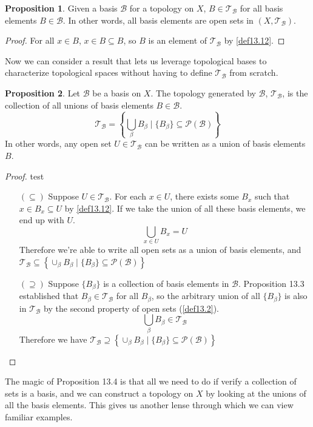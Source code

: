 \documentclass{article}
\newcommand{\T}{\mathcal{T}}
\theoremstyle{definition}
\newtheorem{proposition}{Proposition}[section]
\begin{document}
	\begin{proposition}
		Given a basis $\mathscr B$ for a topology on $X$, $B\in\T_{\mathscr B}$ for all basis elements $B\in\mathscr{B}$. In other words, all basis elements are open sets in $(X,\T_{\mathscr B})$.
	\end{proposition}
	\begin{proof}
		For all $x\in B$, $x\in B\subseteq B$, so $B$ is an element of $\T_{\mathscr B}$ by \cref{def13.12}. 
	\end{proof}

	Now we can consider a result that lets us leverage topological bases to characterize topological spaces without having to define $\T_{\mathscr B}$ from scratch. 
	
	\begin{proposition}
		Let $\mathscr{B}$ be a basis on $X$. The topology generated by $\mathscr{B}$, $\T_{\mathscr B}$, is the collection of all unions of basis elements $B\in\mathscr{B}$. 
		$$ \T_{\mathscr B} = \left\{\bigcup_{\beta}B_\beta \mid \{B_\beta\} \subseteq \mathcal P(\mathscr{B})\right\}$$
		In other words, any open set $U\in \T_{\mathscr B}$ can be written as a union of basis elements $B$.
	\end{proposition}
	\begin{proof}{\color{white}test}
		\begin{enumerate}
			\item [$(\subseteq)$] Suppose $U\in \T_{\mathscr B}$. For each $x\in U$, there exists some $B_x$ such that $x\in B_x \subseteq U$ by \cref{def13.12}. If we take the union of all these basis elements, we end up with $U$. 
			$$ \bigcup_{x\in U}B_x = U$$
			Therefore we're able to write all open sets as a union of basis elements, and $ \T_{\mathscr B}\subseteq\left\{\cup_{\beta}B_\beta \mid \{B_\beta\} \subseteq \mathcal P(\mathscr{B})\right\}$
			\item [$(\supseteq)$] Suppose $\{B_\beta\}$ is a collection of basis elements in $\mathscr B$. Proposition 13.3 established that $B_\beta \in \T_{\mathscr B}$ for all $B_\beta$, so the arbitrary union of all $\{B_\beta\}$ is also in $\T_{\mathscr B}$ by the second property of open sets (\cref{def13.2}). 
			$$ \bigcup_{\beta}B_\beta \in \T_{\mathscr B}$$ Therefore we have $ \T_{\mathscr B}\supseteq\left\{\cup_{\beta}B_\beta \mid \{B_\beta\} \subseteq \mathcal P(\mathscr{B})\right\}$
		\end{enumerate}
	\end{proof}
	
	The magic of Proposition 13.4 is that all we need to do if verify a collection of sets is a basis, and we can construct a topology on $X$ by looking at the unions of all the basis elements. This gives us another lense through which we can view familiar examples.
	
\end{document}
